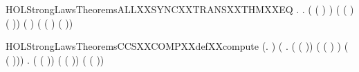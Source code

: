 \begin{SaveVerbatim}{HOLStrongLawsTheoremsALLXXSYNCXXTRANSXXTHMXXEQ}
\HOLTokenTurnstile{} \HOLSymConst{\HOLTokenForall{}}     .
            \HOLTokenTransBegin{}\HOLTokenTransEnd {} \HOLSymConst{\HOLTokenEquiv{}}
       \HOLSymConst{\HOLTokenExists{}}  .
            \HOLSymConst{\HOLTokenLeq{}}  \HOLSymConst{\HOLTokenConj{}}  \HOLSymConst{\HOLTokenLeq{}}  \HOLSymConst{\HOLTokenConj{}} ( ( ) \HOLSymConst{=}  ) \HOLSymConst{\HOLTokenConj{}}
           ( ( ) \HOLSymConst{=}  ( )) \HOLSymConst{\HOLTokenConj{}} ( \HOLSymConst{=} \HOLConst{\ensuremath{\tau}}) \HOLSymConst{\HOLTokenConj{}}
           ( \HOLSymConst{=}  ( ) \HOLSymConst{\ensuremath{\parallel}}  ( ))
\end{SaveVerbatim}
\newcommand{\HOLStrongLawsTheoremsALLXXSYNCXXTRANSXXTHMXXEQ}{\UseVerbatim{HOLStrongLawsTheoremsALLXXSYNCXXTRANSXXTHMXXEQ}}
\begin{SaveVerbatim}{HOLStrongLawsTheoremsCCSXXCOMPXXdefXXcompute}
\HOLTokenTurnstile{} (\HOLSymConst{\HOLTokenForall{}}.    \HOLSymConst{=}  ) \HOLSymConst{\HOLTokenConj{}}
   (\HOLSymConst{\HOLTokenForall{}} .
          ( ( )) \HOLSymConst{=}
          ( ( ) \HOLSymConst{\ensuremath{-}} ) \HOLSymConst{\ensuremath{\parallel}}  ( ( ))) \HOLSymConst{\HOLTokenConj{}}
   \HOLSymConst{\HOLTokenForall{}} .
         ( ( )) \HOLSymConst{=}
         ( ( )) \HOLSymConst{\ensuremath{\parallel}}  ( ( ))
\end{SaveVerbatim}
